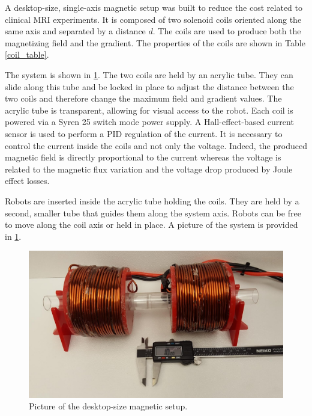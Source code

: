\documentclass[letterpaper, 10 pt, conference]{ieeeconf}  %
\begin{document}
A desktop-size, single-axis magnetic setup was built to reduce the cost related to clinical MRI experiments.
 It is composed of two solenoid coils oriented along the same axis and separated by a distance $d$. 
 The coils are used to produce both the magnetizing field and the gradient. 
 The properties of the coils are shown in Table \ref{coil_table}.\par
The system is shown in \cref{magnetic_setup}.
 The two coils are held by an acrylic tube. 
 They can slide along this tube and be locked in place to adjust the distance between the two coils and therefore change the maximum field and gradient values. 
 The acrylic tube is transparent, allowing for visual access to the robot.
Each coil is powered via a Syren 25 switch mode power supply. 
A Hall-effect-based current sensor is used to perform a PID regulation of the current. 
It is necessary to control the current inside the coils and not only the voltage. 
Indeed, the produced magnetic field is directly proportional to the current whereas the voltage is related to the magnetic flux variation and the voltage drop produced by Joule effect losses.\par
Robots are inserted inside the acrylic tube holding the coils. 
They are held by a second, smaller tube that guides them along the system axis. 
Robots can be free to move along the coil axis or held in place. 
A picture of the system is provided in \cref{magnetic_setup}.

\begin{figure}
  \includegraphics[width=\linewidth]{Magnetic_setup.jpg}
  \caption{Picture of the desktop-size magnetic setup.}
  \label{magnetic_setup}
\end{figure}
\end{document}
